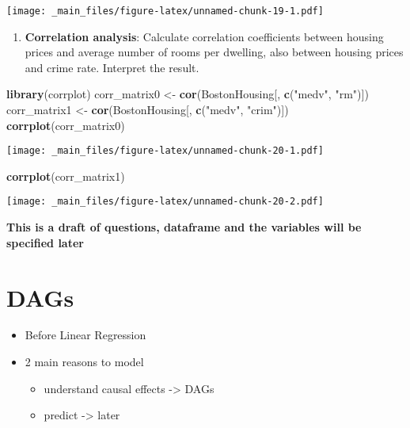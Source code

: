 \documentclass[
]{book}
\newenvironment{Shaded}{\begin{snugshade}}{\end{snugshade}}
\newcommand{\FunctionTok}[1]{\textcolor[rgb]{0.13,0.29,0.53}{\textbf{#1}}}
\newcommand{\NormalTok}[1]{#1}
\newcommand{\OtherTok}[1]{\textcolor[rgb]{0.56,0.35,0.01}{#1}}
\newcommand{\StringTok}[1]{\textcolor[rgb]{0.31,0.60,0.02}{#1}}
\providecommand{\tightlist}{%
  \setlength{\itemsep}{0pt}\setlength{\parskip}{0pt}}
\begin{document}
\texttt{[image: \_main\_files/figure-latex/unnamed-chunk-19-1.pdf]}

\begin{enumerate}
\def\labelenumi{\arabic{enumi}.}
\setcounter{enumi}{7}
\tightlist
\item
  \textbf{Correlation analysis}: Calculate correlation coefficients between housing prices and average number of rooms per dwelling, also between housing prices and crime rate. Interpret the result.
\end{enumerate}

\begin{Shaded}
\begin{Highlighting}[]
\FunctionTok{library}\NormalTok{(corrplot)}
\NormalTok{corr\_matrix0 }\OtherTok{\textless{}{-}} \FunctionTok{cor}\NormalTok{(BostonHousing[, }\FunctionTok{c}\NormalTok{(}\StringTok{"medv"}\NormalTok{, }\StringTok{"rm"}\NormalTok{)])}
\NormalTok{corr\_matrix1 }\OtherTok{\textless{}{-}} \FunctionTok{cor}\NormalTok{(BostonHousing[, }\FunctionTok{c}\NormalTok{(}\StringTok{"medv"}\NormalTok{, }\StringTok{"crim"}\NormalTok{)])}
\FunctionTok{corrplot}\NormalTok{(corr\_matrix0)}
\end{Highlighting}
\end{Shaded}

\texttt{[image: \_main\_files/figure-latex/unnamed-chunk-20-1.pdf]}

\begin{Shaded}
\begin{Highlighting}[]
\FunctionTok{corrplot}\NormalTok{(corr\_matrix1)}
\end{Highlighting}
\end{Shaded}

\texttt{[image: \_main\_files/figure-latex/unnamed-chunk-20-2.pdf]}

\textbf{This is a draft of questions, dataframe and the variables will be specified later}

\hypertarget{dags-1}{%
\chapter{DAGs}\label{dags-1}}

\begin{itemize}
\tightlist
\item
  Before Linear Regression
\item
  2 main reasons to model

  \begin{itemize}
  \tightlist
  \item
    understand causal effects -\textgreater{} DAGs
  \item
    predict -\textgreater{} later
  \end{itemize}
\end{itemize}
\end{document}
